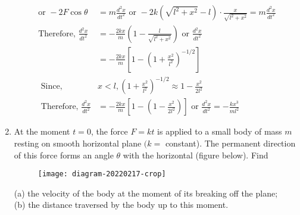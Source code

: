 \begin{enumerate}
\begin{answer}
\begin{align*}
	\text{or }-2 F \cos \theta&=m \frac{d^{2} x}{d t^{2}}\text{ or }-2 k\left(\sqrt{l^{2}+x^{2}}-l\right) \cdot \frac{x}{\sqrt{l^{2}+x^{2}}}=m \frac{d^{2} x}{d t^{2}}\\
	\text{Therefore, }\frac{d^{2} x}{d t^{2}}&=-\frac{2 k x}{m}\left(1-\frac{l}{\sqrt{l^{2}+x^{2}}}\right)\text{ or }\frac{d^{2} x}{d t^{2}}\\&=-\frac{2 k x}{m}\left[1-\left(1+\frac{x^{2}}{l^{2}}\right)^{-1 / 2}\right]\\
\text{	Since, }&x<l,\left(1+\frac{x^{2}}{l^{2}}\right)^{-1 / 2} \approx 1-\frac{x^{2}}{2 l^{2}}\\
\text{	Therefore, }\frac{d^{2} x}{d t^{2}}&=-\frac{2 k x}{m}\left[1-\left(1-\frac{x^{2}}{2 l^{2}}\right)\right]\text{ or }\frac{d^{2} x}{d t^{2}}=-\frac{k x^{3}}{m l^{2}}
		\end{align*}
	\end{answer}
\item At the moment $t=0$, the force $F=k t$ is applied to a small body of mass $m$ resting on smooth horizontal plane $(k=$ constant). The permanent direction of this force forms an angle $\theta$ with the horizontal (figure below). Find\\
\begin{figure}[H]
	\centering
	\texttt{[image: diagram-20220217-crop]}
\end{figure}
(a) the velocity of the body at the moment of its breaking off the plane;\\
(b) the distance traversed by the body up to this moment.


\end{enumerate}
